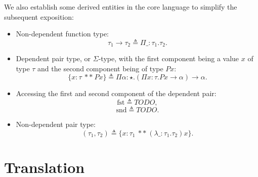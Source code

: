 \documentclass[a4paper]{article}
\begin{document}
We also establish some derived entities in the core language to simplify the subsequent exposition:

\begin{itemize}
  \item Non-dependent function type:
    \[
      \tau_1 \rightarrow \tau_2 \triangleq \Pi \_ : \tau_1. \tau_2.
    \]
  \item Dependent pair type, or $\Sigma$-type, with the first component being a value $x$ of type $\tau$ and the second component being of type $P x$:
    \[
      \{ x : \tau\ **\ P x \} \triangleq \Pi \alpha : \star. (\Pi x : \tau. P x \rightarrow \alpha) \rightarrow \alpha.
    \]
  \item Accessing the first and second component of the dependent pair:
    \[
      \text{fst} \triangleq TODO,
    \]
    \[
      \text{snd} \triangleq TODO.
    \]
  \item Non-dependent pair type:
    \[
      (\tau_1, \tau_2) \triangleq \{ x : \tau_1\ **\ (\lambda \_ : \tau_1. \tau_2) x \}.
    \]
\end{itemize}

\section{Translation}
\end{document}
